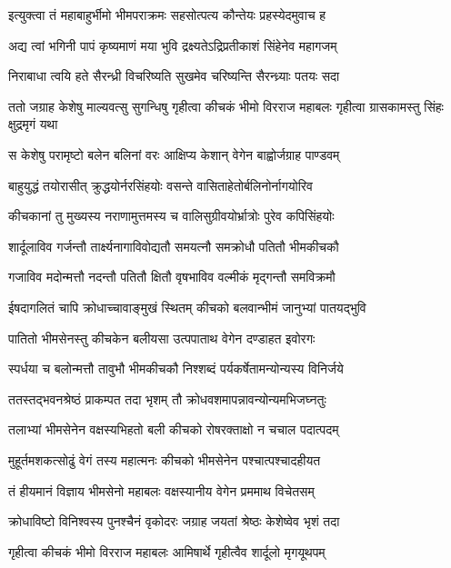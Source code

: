 
\twolineshloka
{इत्युक्त्वा तं महाबाहुर्भीमो भीमपराक्रमः}
{सहसोत्पत्य कौन्तेयः प्रहस्येदमुवाच ह}


\twolineshloka
{अद्य त्वां भगिनी पापं कृष्यमाणं मया भुवि}
{द्रक्ष्यतेऽद्रिप्रतीकाशं सिंहेनेव महागजम्}


\twolineshloka
{निराबाधा त्वयि हते सैरन्ध्री विचरिष्यति}
{सुखमेव चरिष्यन्ति सैरन्ध्र्याः पतयः सदा}


\onelineshloka
{ततो जग्राह केशेषु माल्यवत्सु सुगन्धिषु}
\twolineshloka
{गृहीत्वा कीचकं भीमो विरराज महाबलः}
{गृहीत्वा ग्रासकामस्तु सिंहः क्षुद्रमृगं यथा}


\twolineshloka
{स केशेषु परामृष्टो बलेन बलिनां वरः}
{आक्षिप्य केशान् वेगेन बाह्वोर्जग्राह पाण्डवम्}


\twolineshloka
{बाहुयुद्धं तयोरासीत् क्रुद्धयोर्नरसिंहयोः}
{वसन्ते वासिताहेतोर्बलिनोर्नागयोरिव}


\twolineshloka
{कीचकानां तु मुख्यस्य नराणामुत्तमस्य च}
{वालिसुग्रीवयोर्भ्रात्रोः पुरेव कपिसिंहयोः}


\twolineshloka
{शार्दूलाविव गर्जन्तौ तार्क्ष्यनागाविवोद्यतौ}
{समयत्नौ समक्रोधौ पतितौ भीमकीचकौ}


\twolineshloka
{गजाविव मदोन्मत्तौ नदन्तौ पतितौ क्षितौ}
{वृषभाविव वल्मीकं मृद्गन्तौ समविक्रमौ}


\twolineshloka
{ईषदागलितं चापि क्रोधाच्चावाङ्मुखं स्थितम्}
{कीचको बलवान्भीमं जानुभ्यां पातयद्भुवि}


\twolineshloka
{पातितो भीमसेनस्तु कीचकेन बलीयसा}
{उत्पपाताथ वेगेन दण्डाहत इवोरगः}


\twolineshloka
{स्पर्धया च बलोन्मत्तौ तावुभौ भीमकीचकौ}
{निश्शब्दं पर्यकर्षेतामन्योन्यस्य विनिर्जये}


\twolineshloka
{ततस्तद्भवनश्रेष्ठं प्राकम्पत तदा भृशम्}
{तौ क्रोधवशमापन्नावन्योन्यमभिजघ्नतुः}


\twolineshloka
{तलाभ्यां भीमसेनेन वक्षस्यभिहतो बली}
{कीचको रोषरक्ताक्षो न चचाल पदात्पदम्}


\twolineshloka
{मुहूर्तमशकत्सोढुं वेगं तस्य महात्मनः}
{कीचको भीमसेनेन पश्चात्पश्चादहीयत}


\twolineshloka
{तं हीयमानं विज्ञाय भीमसेनो महाबलः}
{वक्षस्यानीय वेगेन प्रममाथ विचेतसम्}


\twolineshloka
{क्रोधाविष्टो विनिश्वस्य पुनश्चैनं वृकोदरः}
{जग्राह जयतां श्रेष्ठः केशेष्वेव भृशं तदा}


\twolineshloka
{गृहीत्वा कीचकं भीमो विरराज महाबलः}
{आमिषार्थे गृहीत्वैव शार्दूलो मृगयूथपम्}


